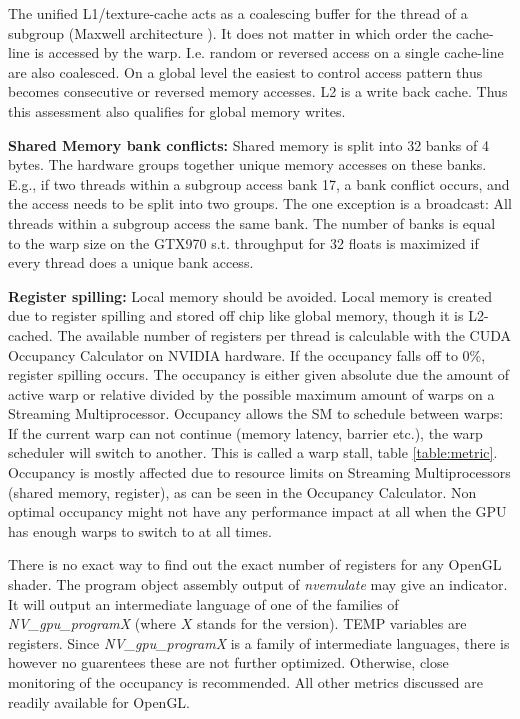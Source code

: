\documentclass[m,times]{cgMA}
\begin{document}
The unified L1/texture-cache acts as a coalescing buffer for the thread of a subgroup (Maxwell architecture \cite{NVIDIA:MAXWELL}). It does not matter in which order the cache-line is accessed by the warp. I.e. random or reversed access on a single cache-line are also coalesced. On a global level the easiest to control access pattern thus becomes consecutive or reversed memory accesses. L2 is a write back cache. Thus this assessment also qualifies for global memory writes. \cite{NVIDIA:MEMORY_BAND}


\textbf{Shared Memory bank conflicts:} Shared memory is split into 32 banks of 4 bytes. The hardware groups together unique memory accesses on these banks. E.g., if two threads within a subgroup access bank 17, a bank conflict occurs, and the access needs to be split into two groups. The one exception is a broadcast: All threads within a subgroup access the same bank. The number of banks is equal to the warp size on the GTX970 s.t. throughput for 32 floats is maximized if every thread does a unique bank access. \cite{NVIDIA:BEST:PRACTICE}


\textbf{Register spilling:} Local memory should be avoided. Local memory is created due to register spilling and stored off chip like global memory, though it is L2-cached. The available number of registers per thread is calculable with the CUDA Occupancy Calculator \cite{NVIDIA:OCCUPANCY} on NVIDIA hardware. If the occupancy falls off to 0\%, register spilling occurs. The occupancy is either given absolute due the amount of active warp or relative divided by the possible maximum amount of warps on a Streaming Multiprocessor. Occupancy allows the SM to schedule between warps: If the current warp can not continue (memory latency, barrier etc.), the warp scheduler will switch to another. This is called a warp stall, table \ref{table:metric}. Occupancy is mostly affected due to resource limits on Streaming Multiprocessors (shared memory, register), as can be seen in the Occupancy Calculator. Non optimal occupancy might not have any performance impact at all when the GPU has enough warps to switch to at all times. \cite{NVIDIA:ACHIEVED_OCCUPANCY}

There is no exact way to find out the exact number of registers for any OpenGL shader. The program object assembly output of \textit{nvemulate} \cite{NVIDIA:EMULATE} may give an indicator. It will output an intermediate language of one of the families of \textit{NV\_gpu\_\-programX} (where $X$ stands for the version). TEMP variables are registers. Since \textit{NV\_gpu\_programX} is a family of intermediate languages, there is however no guarentees these are not further optimized. Otherwise, close monitoring of the occupancy is recommended. All other metrics discussed are readily available for OpenGL.
\end{document}
